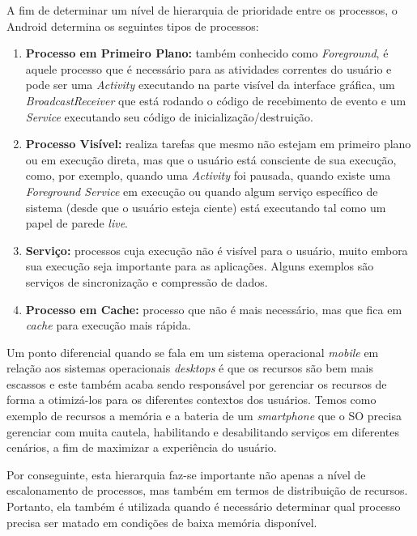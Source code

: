 \documentclass[12pt, a4paper]{article}
\newcommand{\tit}[1]{\textit{#1}}
\newcommand{\tb}[1]{\textbf{#1}}
\begin{document}
    A fim de determinar um nível de hierarquia de prioridade entre os processos, o Android determina os seguintes tipos de processos:\cite{android:proccess-lifecycle}
    \begin{enumerate}[label=\textbf{\arabic*.}]
        \item \tb{Processo em Primeiro Plano:} também conhecido como \tit{Foreground}, é aquele processo que é necessário para as atividades correntes do usuário e pode ser uma \tit{Activity} executando na parte visível da interface gráfica, um \tit{BroadcastReceiver} que está rodando o código de recebimento de evento e um \tit{Service} executando seu código de inicialização/destruição.
        \item \tb{Processo Visível:} realiza tarefas que mesmo não estejam em primeiro plano ou em execução direta, mas que o usuário está consciente de sua execução, como, por exemplo, quando uma \tit{Activity} foi pausada, quando existe uma \tit{Foreground Service} em execução ou quando algum serviço específico de sistema (desde que o usuário esteja ciente) está executando tal como um papel de parede \tit{live}.
        \item \tb{Serviço:} processos cuja execução não é visível para o usuário, muito embora sua execução seja importante para as aplicações. Alguns exemplos são serviços de sincronização e compressão de dados.
        \item \tb{Processo em Cache:} processo que não é mais necessário, mas que fica em \tit{cache} para execução mais rápida.
    \end{enumerate}
    
    Um ponto diferencial quando se fala em um sistema operacional \tit{mobile} em relação aos sistemas operacionais \tit{desktops} é que os recursos são bem mais escassos e este também acaba sendo responsável por gerenciar os recursos de forma a otimizá-los para os diferentes contextos dos usuários. Temos como exemplo de recursos a memória e a bateria de um \tit{smartphone} que o SO precisa gerenciar com muita cautela, habilitando e desabilitando serviços em diferentes cenários, a fim de maximizar a experiência do usuário.
    
    Por conseguinte, esta hierarquia faz-se importante não apenas a nível de escalonamento de processos, mas também em termos de distribuição de recursos. Portanto, ela também é utilizada quando é necessário determinar qual processo precisa ser matado em condições de baixa memória disponível.\cite{android:proccess-lifecycle}
   
\end{document}
